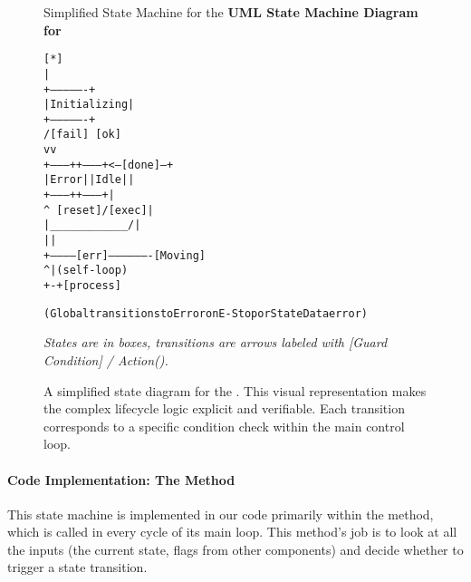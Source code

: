 \begin{figure}[h!]
    \centering
    \begin{infobox}{Simplified State Machine for the }
        \textbf{UML State Machine Diagram for }

        {\footnotesize
        \begin{alltt}
                   [*]
                    |
            +----------------+
            |  Initializing  |
            +----------------+
           / [fail]    \ [ok]
          v             v
 +---------+         +---------+<--[done]---+
 |  Error  |         |   Idle  |            |
 +---------+         +---------+            |
    ^   \ [reset]      / [exec]             |
    |    \____________/                     |
    |                                       |
    +------------[err]-------------------[Moving]
                                            ^ | (self-loop)
                                            +-+ [process]

(Global transitions to Error on E-Stop or StateData error)
        \end{alltt}
        }
        \textit{States are in boxes, transitions are arrows labeled with [Guard Condition] / Action().}
    \end{infobox}
            \vspace{0.3cm}
    \caption{A simplified state diagram for the . This visual representation makes the complex lifecycle logic explicit and verifiable. Each transition corresponds to a specific condition check within the main control loop.}
    \label{fig:controller_state_machine}
\end{figure}

\paragraph{Code Implementation: The  Method}
This state machine is implemented in our code primarily within the  method, which is called in every cycle of its main loop. This method's job is to look at all the inputs (the current state, flags from other components) and decide whether to trigger a state transition.

